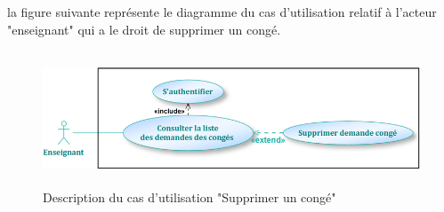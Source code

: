 \documentclass[12 pt]{report}
\begin{document}
la figure suivante représente le diagramme du cas d'utilisation relatif à l'acteur "enseignant" qui a le droit de supprimer un congé.
\begin{figure}[h]
\begin{center}
\includegraphics[width= 12cm , height = 4cm]{e42.png}
\caption{Description du cas d'utilisation "Supprimer un congé"}
\end{center}
\end{figure}
\newpage
\end{document}
